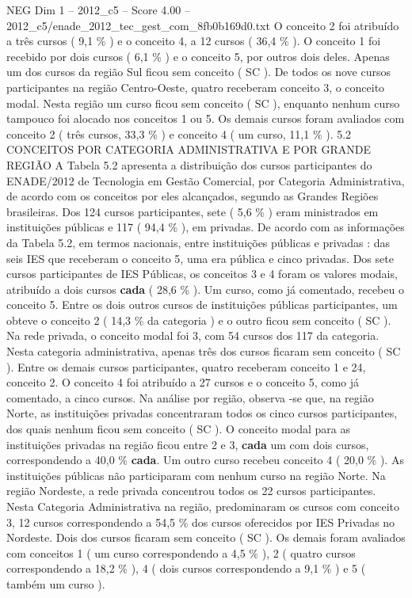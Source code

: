 \begin{textsample}{NEG Dim 1 – 2012\_c5 – Score 4.00 – 2012\_c5/enade\_2012\_tec\_gest\_com\_8fb0b169d0.txt}
O conceito 2 foi atribuído a três cursos ( 9,1 \% ) e o conceito 4, a 12 cursos ( 36,4 \% ).
O conceito 1 foi recebido por dois cursos ( 6,1 \% ) e o conceito 5, por outros dois deles.
Apenas um dos cursos da região Sul ficou sem conceito ( SC ).
De todos os nove cursos participantes na região Centro-Oeste, quatro receberam conceito 3, o conceito modal.
Nesta região um curso ficou sem conceito ( SC ), enquanto nenhum curso tampouco foi alocado nos conceitos 1 ou 5.
Os demais cursos foram avaliados com conceito 2 ( três cursos, 33,3 \% ) e conceito 4 ( um curso, 11,1 \% ). 5.2 CONCEITOS POR CATEGORIA ADMINISTRATIVA E POR GRANDE REGIÃO A Tabela 5.2 apresenta a distribuição dos cursos participantes do ENADE/2012 de Tecnologia em Gestão Comercial, por Categoria Administrativa, de acordo com os conceitos por eles alcançados, segundo as Grandes Regiões brasileiras.
Dos 124 cursos participantes, sete ( 5,6 \% ) eram ministrados em instituições públicas e 117 ( 94,4 \% ), em privadas.
De acordo com as informações da Tabela 5.2, em termos nacionais, entre instituições públicas e privadas : das seis IES que receberam o conceito 5, uma era pública e cinco privadas.
Dos sete cursos participantes de IES Públicas, os conceitos 3 e 4 foram os valores modais, atribuído a dois cursos \textbf{cada} ( 28,6 \% ).
Um curso, como já comentado, recebeu o conceito 5.
Entre os dois outros cursos de instituições públicas participantes, um obteve o conceito 2 ( 14,3 \% da categoria ) e o outro ficou sem conceito ( SC ).
Na rede privada, o conceito modal foi 3, com 54 cursos dos 117 da categoria.
Nesta categoria administrativa, apenas três dos cursos ficaram sem conceito ( SC ).
Entre os demais cursos participantes, quatro receberam conceito 1 e 24, conceito 2.
O conceito 4 foi atribuído a 27 cursos e o conceito 5, como já comentado, a cinco cursos.
Na análise por região, observa -se que, na região Norte, as instituições privadas concentraram todos os cinco cursos participantes, dos quais nenhum ficou sem conceito ( SC ).
O conceito modal para as instituições privadas na região ficou entre 2 e 3, \textbf{cada} um com dois cursos, correspondendo a 40,0 \% \textbf{cada}.
Um outro curso recebeu conceito 4 ( 20,0 \% ).
As instituições públicas não participaram com nenhum curso na região Norte.
Na região Nordeste, a rede privada concentrou todos os 22 cursos participantes.
Nesta Categoria Administrativa na região, predominaram os cursos com conceito 3, 12 cursos correspondendo a 54,5 \% dos cursos oferecidos por IES Privadas no Nordeste.
Dois dos cursos ficaram sem conceito ( SC ).
Os demais foram avaliados com conceitos 1 ( um curso correspondendo a 4,5 \% ), 2 ( quatro cursos correspondendo a 18,2 \% ), 4 ( dois cursos correspondendo a 9,1 \% ) e 5 ( também um curso ).

\end{textsample}

